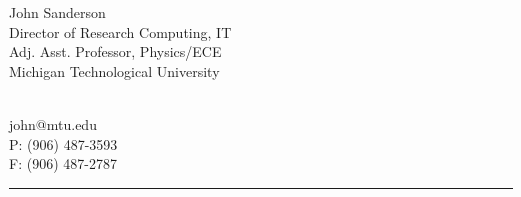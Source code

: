 \begin{minipage}[t]{4.75in}
  \textsf{\large John Sanderson}\\
  Director of Research Computing, IT\\
  Adj. Asst. Professor, Physics/ECE\\
  Michigan Technological University\\
\end{minipage}
\begin{minipage}[t]{1.70in}
  \begin{flushright}
    \hspace*{0.01in}\\
    john@mtu.edu\\
    P: (906) 487-3593\\
    F: (906) 487-2787\\
  \end{flushright}
\end{minipage}
\hrule
